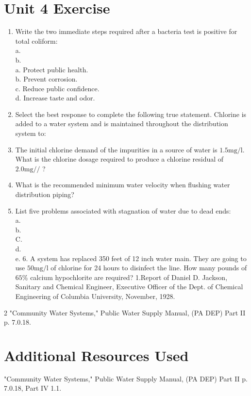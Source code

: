 \documentclass[10pt]{article}
\begin{document}
\section{Unit 4 Exercise}
\begin{enumerate}
  \item Write the two immediate steps required after a bacteria test is positive for total coliform:\\
a.\\
b.\\
a. Protect public health.\\
b. Prevent corrosion.\\
c. Reduce public confidence.\\
d. Increase taste and odor.

  \item Select the best response to complete the following true statement. Chlorine is added to a water system and is maintained throughout the distribution system to:

  \item The initial chlorine demand of the impurities in a source of water is $1.5 \mathrm{mg} / \mathrm{l}$. What is the chlorine dosage required to produce a chlorine residual of $2.0 \mathrm{mg} / /$ ?

  \item What is the recommended minimum water velocity when flushing water distribution piping?

  \item List five problems associated with stagnation of water due to dead ends:\\
a.\\
b.\\
C.\\
d.\\
e. 6. A system has replaced 350 feet of 12 inch water main. They are going to use $50 \mathrm{mg} / \mathrm{l}$ of chlorine for 24 hours to disinfect the line. How many pounds of $65 \%$ calcium hypochlorite are required? 1.Report of Daniel D. Jackson, Sanitary and Chemical Engineer, Executive Officer of the Dept. of Chemical Engineering of Columbia University, November, 1928.

\end{enumerate}
2 "Community Water Systems," Public Water Supply Manual, (PA DEP) Part II p. 7.0.18.

\section{Additional Resources Used}
"Community Water Systems," Public Water Supply Manual, (PA DEP) Part II p. 7.0.18, Part IV 1.1.
\end{document}
